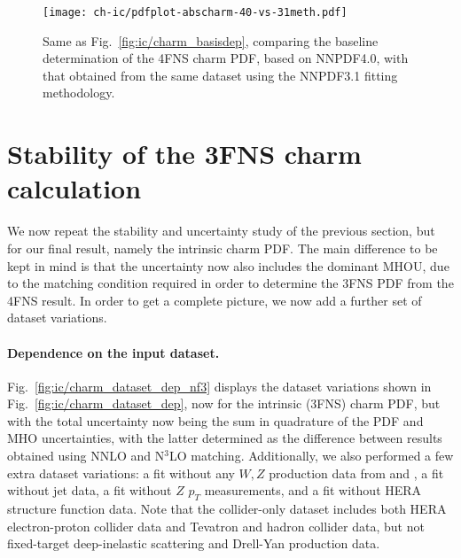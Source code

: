 \begin{figure}[t]
  \begin{center}
    \texttt{[image: ch-ic/pdfplot-abscharm-40-vs-31meth.pdf]}
    \caption{\small Same as Fig.~\ref{fig:ic/charm_basisdep}, comparing
      the baseline determination of the 4FNS charm PDF, based
      on NNPDF4.0, with that obtained
      from the same dataset using the NNPDF3.1 fitting methodology.
  \label{fig:ic/pdfplot-abscharm-40-vs-31meth} }
\end{center}
\end{figure}




\section{Stability of the 3FNS charm calculation}
\label{app:ic/charm_stability_3fns}

We now repeat the stability and uncertainty
study of the previous section, but for our final
result, namely the intrinsic charm PDF. The main difference to be kept
in mind is that the uncertainty now also includes the dominant MHOU,
due to the matching condition required in order to determine the 3FNS
PDF from the 4FNS result. In order to get a complete picture, we now
add a further set of dataset variations.

\paragraph{Dependence on the input dataset.}
%
Fig.~\ref{fig:ic/charm_dataset_dep_nf3} displays the dataset variations shown in
Fig.~\ref{fig:ic/charm_dataset_dep}, now for the intrinsic (3FNS) charm
PDF, but with the total uncertainty now being the sum in quadrature of
the PDF and MHO uncertainties, with the latter determined as the difference between
results obtained using NNLO and N$^3$LO matching.
%
Additionally, we also performed a few extra  dataset
variations: a fit without any $W, Z$ production data from \atlas and \cms,
a fit without jet data, a fit without $Z$ $p_T$ measurements, and a fit without
HERA structure function data.
%
Note that the collider-only dataset includes both HERA electron-proton
collider data and Tevatron and \lhc hadron collider data, but not
fixed-target deep-inelastic scattering and Drell-Yan production data.


